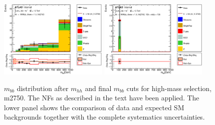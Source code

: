 \begin{figure}
\begin{center}
\includegraphics*[width=0.47\textwidth] {figures/Unblinded_mbb/C_reOpt2000_bbpt350_wwpt250_drww15_hh2750_bbMass_regionA_met25d020.eps}
\includegraphics*[width=0.47\textwidth] {figures/Unblinded_mbb/C_reOpt2000_bbpt350_wwpt250_drww15_hh2750_mbb_bbMass_regionA_met25d020.eps}
\caption[$m_{bb}$ distribution after $m_{hh}$ and final $m_{bb}$ cuts for high-mass selection, m2750.]{$m_{bb}$ distribution after $m_{hh}$ and final $m_{bb}$ cuts for high-mass selection, m2750. The NFs as described in the text have been applied. The lower panel shows the comparison of data and expected SM backgrounds together with the complete systematics uncertainties.}
\end{center}
\end{figure}

